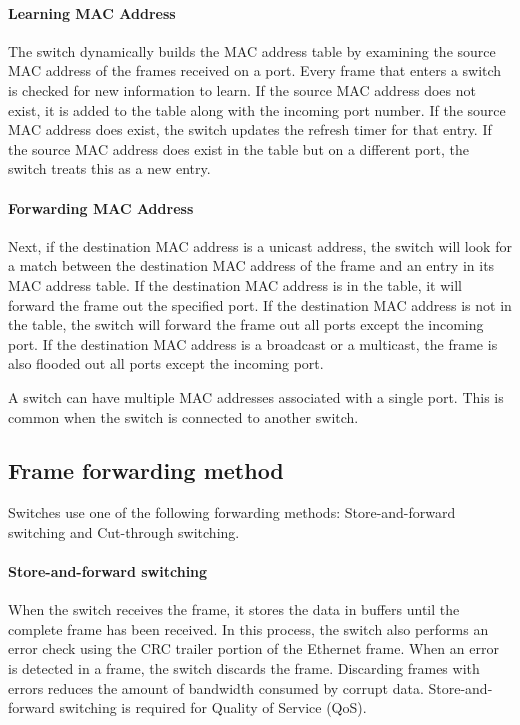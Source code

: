 \paragraph{Learning MAC Address} The switch dynamically builds the MAC address table by examining the source MAC address of the frames received on a port. Every frame that enters a switch is checked for new information to learn. If the source MAC address does not exist, it is added to the table along with the incoming port number. If the source MAC address does exist, the switch updates the refresh timer for that entry.  If the source MAC address does exist in the table but on a different port, the switch treats this as a new entry.

\paragraph{Forwarding MAC Address} Next, if the destination MAC address is a unicast address, the switch will look for a
match between the destination MAC address of the frame and an entry in its MAC address table. If the destination MAC address is in the table, it will forward the frame out the specified port. If the destination MAC address is not in the table, the switch will forward the frame out all ports except the incoming port. If the destination MAC address is a broadcast or a multicast, the frame is also flooded out all ports except the incoming port.

A switch can have multiple MAC addresses associated with a single port. This is common when the switch is connected to another switch.

\subsection{Frame forwarding method}

Switches use one of the following forwarding methods:  Store-and-forward switching and Cut-through switching.

\paragraph{Store-and-forward switching} When the switch receives the frame, it stores the data in buffers until the complete frame has been received. In this process, the switch also performs an error check using the CRC trailer portion of the Ethernet frame. When an error is detected in a frame, the switch discards the frame. Discarding frames with errors reduces the amount of bandwidth consumed by corrupt data. Store-and-forward switching is required for Quality of Service (QoS).

